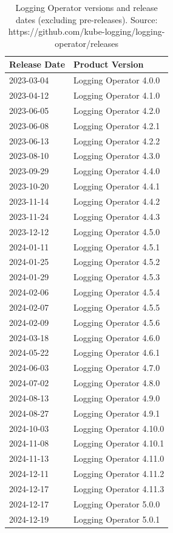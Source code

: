 \documentclass[../main.tex]{subfiles}
\begin{document}
\begin{table}[h]
    \centering
    \begin{tabular}{|l|l|}
        \hline
        \textbf{Release Date} & \textbf{Product Version} \\
        \hline
        2023-03-04 & Logging Operator 4.0.0 \\
        2023-04-12 & Logging Operator 4.1.0 \\
        2023-06-05 & Logging Operator 4.2.0 \\
        2023-06-08 & Logging Operator 4.2.1 \\
        2023-06-13 & Logging Operator 4.2.2 \\
        2023-08-10 & Logging Operator 4.3.0 \\
        2023-09-29 & Logging Operator 4.4.0 \\
        2023-10-20 & Logging Operator 4.4.1 \\
        2023-11-14 & Logging Operator 4.4.2 \\
        2023-11-24 & Logging Operator 4.4.3 \\
        2023-12-12 & Logging Operator 4.5.0 \\
        2024-01-11 & Logging Operator 4.5.1 \\
        2024-01-25 & Logging Operator 4.5.2 \\
        2024-01-29 & Logging Operator 4.5.3 \\
        2024-02-06 & Logging Operator 4.5.4 \\
        2024-02-07 & Logging Operator 4.5.5 \\
        2024-02-09 & Logging Operator 4.5.6 \\
        2024-03-18 & Logging Operator 4.6.0 \\
        2024-05-22 & Logging Operator 4.6.1 \\
        2024-06-03 & Logging Operator 4.7.0 \\
        2024-07-02 & Logging Operator 4.8.0 \\
        2024-08-13 & Logging Operator 4.9.0 \\
        2024-08-27 & Logging Operator 4.9.1 \\
        2024-10-03 & Logging Operator 4.10.0 \\
        2024-11-08 & Logging Operator 4.10.1 \\
        2024-11-13 & Logging Operator 4.11.0 \\
        2024-12-11 & Logging Operator 4.11.2 \\
        2024-12-17 & Logging Operator 4.11.3 \\
        2024-12-17 & Logging Operator 5.0.0 \\
        2024-12-19 & Logging Operator 5.0.1 \\
        \hline
    \end{tabular}
   \caption{Logging Operator versions and release dates (excluding pre-releases). Source: https://github.com/kube-logging/logging-operator/releases}
    \label{table:logging_operator_filtered_versions}
\end{table}
\end{document}
